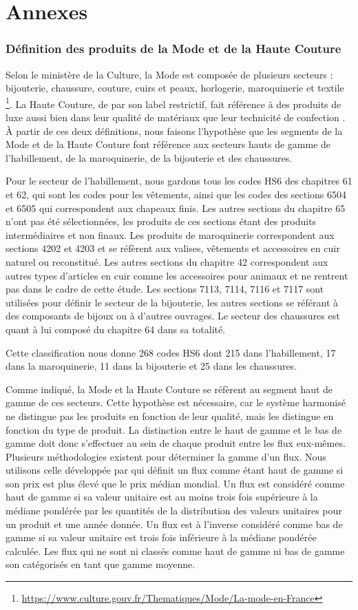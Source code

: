 \documentclass[french,10pt,a4paper]{article}
\newenvironment{annexes}{
    \section*{Annexes}
    \addcontentsline{toc}{section}{Annexes}
    \setstretch{2} %
}{
    \setstretch{1} %
}
\begin{document}
\begin{annexes}
\subsubsection*{Définition des produits de la Mode et de la Haute Couture}
Selon le ministère de la Culture, la Mode est composée de plusieurs secteurs : bijouterie, chaussure, couture, cuirs et peaux, horlogerie, maroquinerie et textile \footnote{\href{https://www.culture.gouv.fr/Thematiques/Mode/La-mode-en-France}{https://www.culture.gouv.fr/Thematiques/Mode/La-mode-en-France}}. La Haute Couture, de par son label restrictif, fait référence à des produits de luxe aussi bien dans leur qualité de matériaux que leur technicité de confection \citep{Agogue2010}. À partir de ces deux définitions, nous faisons l'hypothèse que les segments de la Mode et de la Haute Couture font référence aux secteurs hauts de gamme de l'habillement, de la maroquinerie, de la bijouterie et des chaussures.

Pour le secteur de l'habillement, nous gardons tous les codes HS6 des chapitres 61 et 62, qui sont les codes pour les vêtements, ainsi que les codes des sections 6504 et 6505 qui correspondent aux chapeaux finis. Les autres sections du chapitre 65 n'ont pas été sélectionnées, les produits de ces sections étant des produits intermédiaires et non finaux. Les produits de maroquinerie correspondent aux sections 4202 et 4203 et se réfèrent aux valises, vêtements et accessoires en cuir naturel ou reconstitué. Les autres sections du chapitre 42 correspondent aux autres types d'articles en cuir comme les accessoires pour animaux et ne rentrent pas dans le cadre de cette étude. Les sections 7113, 7114, 7116 et 7117 sont utilisées pour définir le secteur de la bijouterie, les autres sections se référant à des composants de bijoux ou à d'autres ouvrages. Le secteur des chaussures est quant à lui composé du chapitre 64 dans sa totalité.

Cette classification nous donne 268 codes HS6 dont 215 dans l'habillement, 17 dans la maroquinerie, 11 dans la bijouterie et 25 dans les chaussures. 

Comme indiqué, la Mode et la Haute Couture se réfèrent au segment haut de gamme de ces secteurs. Cette hypothèse est nécessaire, car le système harmonisé ne distingue pas les produits en fonction de leur qualité, mais les distingue en fonction du type de produit. La distinction entre le haut de gamme et le bas de gamme doit donc s'effectuer au sein de chaque produit entre les flux eux-mêmes. Plusieurs méthodologies existent pour déterminer la gamme d'un flux. Nous utilisons celle développée par \cite{Fontagne1997} qui définit un flux comme étant haut de gamme si son \og prix\fg{} est plus élevé que le \og prix\fg{} médian mondial. Un flux est considéré comme haut de gamme si sa valeur unitaire est au moins trois fois supérieure à la médiane pondérée par les quantités de la distribution des valeurs unitaires pour un produit et une année donnée. Un flux est à l'inverse considéré comme bas de gamme si sa valeur unitaire est trois fois inférieure à la médiane pondérée calculée. Les flux qui ne sont ni classés comme haut de gamme ni bas de gamme son catégorisés en tant que gamme moyenne. 


\end{annexes}
\end{document}
